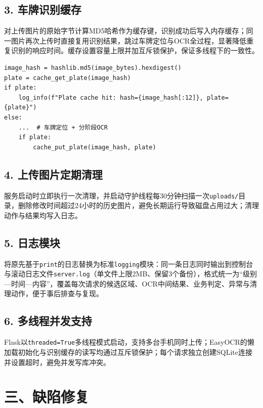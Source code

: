 \documentclass[12pt,a4paper]{article}
\begin{document}
\subsection*{3. 车牌识别缓存}
对上传图片的原始字节计算MD5哈希作为缓存键，识别成功后写入内存缓存；同一图片再次上传时直接复用识别结果，跳过车牌定位与OCR全过程，显著降低重复识别的响应时间。缓存设置容量上限并加互斥锁保护，保证多线程下的一致性。

\begin{lstlisting}
image_hash = hashlib.md5(image_bytes).hexdigest()
plate = cache_get_plate(image_hash)
if plate:
    log_info(f"Plate cache hit: hash={image_hash[:12]}, plate={plate}")
else:
    ...  # 车牌定位 + 分阶段OCR
    if plate:
        cache_put_plate(image_hash, plate)
\end{lstlisting}

\subsection*{4. 上传图片定期清理}
服务启动时立即执行一次清理，并启动守护线程每30分钟扫描一次\texttt{uploads/}目录，删除修改时间超过24小时的历史图片，避免长期运行导致磁盘占用过大；清理动作与结果均写入日志。

\subsection*{5. 日志模块}
将原先基于\texttt{print}的日志替换为标准\texttt{logging}模块：同一条日志同时输出到控制台与滚动日志文件\texttt{server.log}（单文件上限2MB、保留3个备份），格式统一为“级别—时间—内容”，覆盖每次请求的候选区域、OCR中间结果、业务判定、异常与清理动作，便于事后排查与复现。

\subsection*{6. 多线程并发支持}
Flask以\texttt{threaded=True}多线程模式启动，支持多台手机同时上传；EasyOCR的懒加载初始化与识别缓存的读写均通过互斥锁保护；每个请求独立创建SQLite连接并设置超时，避免并发写库冲突。

\section*{三、缺陷修复}
\end{document}
